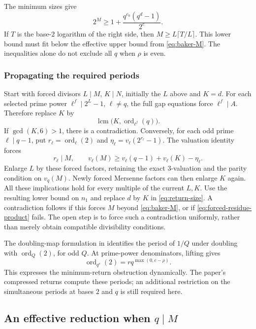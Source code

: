 \documentclass[11pt]{article}
\begin{document}
The minimum sizes give
\begin{equation}\label{eq:return-size}
2^M\ge1+\frac{q^{e_0}(q^d-1)}{2^c}.
\end{equation}
If $T$ is the base-$2$ logarithm of the right side, then
$M\ge L\lceil T/L\rceil$. This lower bound must fit below the
effective upper bound from \eqref{eq:baker-M}.
The inequalities alone do not exclude all $q$ when $\rho$ is even.

\subsubsection*{Propagating the required periods}
Start with forced divisors $L\mid M$, $K\mid N$, initially the $L$
above and $K=d$. For each selected prime power $\ell^f\mid2^L-1$,
$\ell\ne q$, the full gap equations force $\ell^f\mid A$. Therefore
replace $K$ by
\[
\operatorname{lcm}\bigl(K,\operatorname{ord}_{\ell^f}(q)\bigr).
\]
If $\gcd(K,6)>1$, there is a contradiction.
Conversely, for each odd prime $\ell\mid q-1$, put
$r_\ell=\operatorname{ord}_\ell(2)$ and
$\eta_\ell=v_\ell(2^{r_\ell}-1)$. The valuation identity forces
\[
r_\ell\mid M,\qquad
v_\ell(M)\ge v_\ell(q-1)+v_\ell(K)-\eta_\ell.
\]
Enlarge $L$ by these forced factors, retaining the exact $3$-valuation
and the parity condition on $v_q(M)$. Newly forced Mersenne factors
can then enlarge $K$ again. All these implications hold for every
multiple of the current $L,K$.
Use the resulting lower bound on $n_1$ and replace $d$ by $K$ in
\eqref{eq:return-size}. A contradiction follows if this forces $M$
beyond \eqref{eq:baker-M}, or if \eqref{eq:forced-residue-product} fails.
The open step is to force such a contradiction uniformly, rather
than merely obtain compatible divisibility conditions.

The doubling-map formulation in \cite[Theorem A and \S4]{AGJ26}
identifies the period of $1/Q$ under doubling with
$\operatorname{ord}_Q(2)$, for odd $Q$. At prime-power denominators,
lifting gives
\[
\operatorname{ord}_{q^e}(2)=r q^{\max(0,e-\rho)}.
\]
This expresses the minimum-return obstruction dynamically. The paper's
compressed returns compute these periods; an additional restriction on
the simultaneous periods at bases $2$ and $q$ is still required here.

\subsection{\texorpdfstring{An effective reduction when $q\mid M$}{An effective reduction when q divides  M}}
\end{document}
